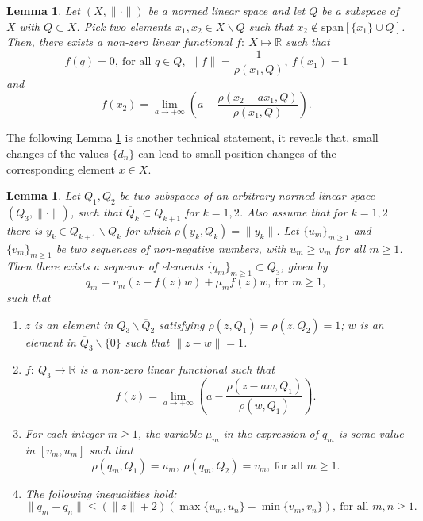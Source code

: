 \documentclass[12pt, reqno]{amsart}
\newtheorem{lemma}[theorem]{Lemma}
\theoremstyle{definition}
\theoremstyle{remark}
\numberwithin{equation}{section}
\begin{document}
\begin{lemma}
\label{lemma1'}
Let $(X,\|\cdot\|)$ be a normed linear space and let $Q$ be a subspace of $X$ with $\overline Q\subset X$. Pick two elements $x_1,x_2\in X\backslash \overline Q$ such that $x_2\notin \mbox{span} [\{x_1\}\cup Q]$. Then, there exists a non-zero linear functional $f:~X\longmapsto \mathbb R$ such that
\begin{equation}
\label{linearf1}
f(q)=0,~\mbox{for all $q\in Q$},~\|f\|=\frac{1}{\rho(x_1,Q)},~f(x_1)=1
\end{equation}
and
\begin{equation}
\label{linearf2}
f(x_2)=\lim_{a\to+\infty}\left(a-\frac{\rho(x_2-a x_1,Q)}{\rho(x_1,Q)}\right).
\end{equation}
\end{lemma}


  The following Lemma \ref{lemma2} is another technical statement, it reveals that, small changes of the values $\{d_n\}$ can lead to small position changes of the corresponding element $x\in X$.
 \begin{lemma}
 \label{lemma2}
 Let $Q_1,Q_2$ be two subspaces of an arbitrary normed linear space $(Q_3,\|\cdot\|)$, such that $\overline Q_k\subset Q_{k+1}$ for $k=1,2$. Also assume that for $k=1,2$ there is $y_k\in Q_{k+1}\backslash  Q_k$ for which $\rho(y_k,Q_k)=\|y_k\|$. Let $\{u_m\}_{m\ge1}$ and $\{v_m\}_{m\ge1}$ be two sequences of non-negative numbers, with $u_m\ge v_m$ for all $m\ge1$. Then there exists a sequence of elements  $\{q_m\}_{m\ge1}\subset Q_{3}$, given by
$$
q_{m}=v_m(z-f(z)w)+\mu_mf(z)w,~\mbox{for $m\ge1$},
$$
such that
\begin{enumerate}
\renewcommand{\labelenumi}{\alph{enumi})}
\item [(i)]$z$ is an element in $Q_3\backslash \overline Q_2$ satisfying $\rho(z,Q_1)=\rho(z,Q_2)=1$; $w$ is an element in $\overline Q_3\backslash\{0\}$ such that $\|z-w\|=1$.
    \item[(ii)] $f:~Q_3\rightarrow \mathbb R$ is a non-zero linear functional such that 
    $$
    f(z)=\lim_{a\to+\infty}\left(a-\frac{\rho(z-aw,Q_1)}{\rho(w,Q_1)}\right).
    $$
    \item[(iii)] For each integer $m\ge1$, the variable $\mu_m$ in the expression of $q_m$ is some value in $[v_m,u_m]$ such that
     \begin{equation}
 \label{q}
 \rho(q_m,Q_1)=u_m,~\rho(q_m,Q_2)=v_m,~\mbox{for all $m\ge1$}.
 \end{equation}
    \item[(iv)] The following inequalities hold:
 \begin{equation}
 \label{diffq1}
 \|q_m-q_n\|\le (\|z\|+2)\left(\max\{u_m,u_n\}-\min\{v_m,v_n\}\right),~\mbox{for all $m,n\ge1$}.
 \end{equation}
\end{enumerate}
 \end{lemma}
\end{document}
